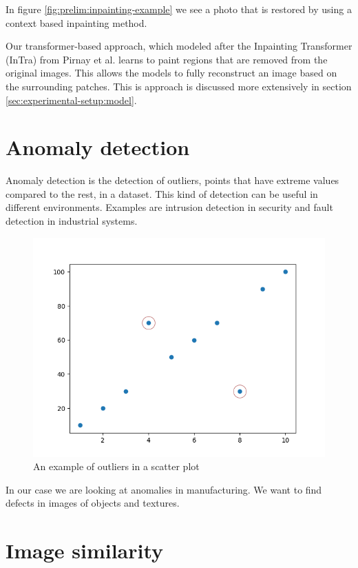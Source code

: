 In figure \ref{fig:prelim:inpainting-example} we see a photo that is restored by using a context based inpainting method.

Our transformer-based approach, which modeled after the Inpainting Transformer (InTra) from Pirnay et al. \cite{pirnay_inpainting_2021} learns to paint regions that are removed from the original images. This allows the models to fully reconstruct an image based on the surrounding patches. This is approach is discussed more extensively in section \ref{sec:experimental-setup:model}.

\section{Anomaly detection}
\label{sec:prelim:anomaly-detection}

Anomaly detection is the detection of outliers, points that have extreme values compared to the rest, in a dataset.
This kind of detection can be useful in different environments. Examples are intrusion detection in security and fault detection in industrial systems.

\begin{figure}[H]
\centering
\includegraphics[width=\textwidth]{imgs/outliers-example.png}
\caption{An example of outliers in a scatter plot}
\label{fig:prelim:outliers-example}
\end{figure}

In our case we are looking at anomalies in manufacturing. We want to find defects in images of objects and textures.

\section{Image similarity}
\label{sec:prelim:image-similarity}

